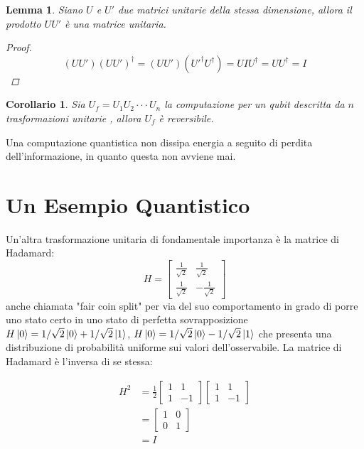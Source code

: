 \documentclass[12pt,a4paper,openright]{report}
\newtheorem{mylem}{Lemma}
\newtheorem*{mycor}{Corollario}
\begin{document}
\begin{mylem}
    Siano $U$ e $U'$ due matrici unitarie della stessa dimensione, allora il prodotto $UU'$ è una matrice unitaria.
    \begin{proof}
        \[
            (UU')(UU')^{\dag}=(UU')({U'}^{\dag}{U}^{\dag}) = UIU^{\dag} = UU^{\dag} = I
        \]
    \end{proof}
\end{mylem} 
\begin{mycor}
    Sia $U_f=U_1U_2 \cdot\cdot\cdot U_n$ la computazione per un qubit descritta da $n$ trasformazioni unitarie , allora $U_f$ è reversibile. 
\end{mycor}
Una computazione quantistica non dissipa energia a seguito di perdita dell'informazione, in quanto questa non avviene mai. 
\section{Un Esempio Quantistico}

Un'altra trasformazione unitaria di fondamentale importanza è la matrice di Hadamard:
\[
    H=\begin{bmatrix}
        \frac{1}{\sqrt2} & \frac{1}{\sqrt2} \\
        \frac{1}{\sqrt2} & -\frac{1}{\sqrt2} 
    \end{bmatrix}
\] 
anche chiamata "fair coin split" per via del suo comportamento in grado di porre uno stato certo in uno stato di perfetta sovrapposizione 
$H\ket0 = 1/\sqrt2\ket0 + 1/\sqrt2\ket1$, $H\ket0 = 1/\sqrt2\ket0 - 1/\sqrt2\ket1$ che presenta una distribuzione di probabilità uniforme
sui valori dell'osservabile.
La matrice di Hadamard è l'inversa di se stessa:
\begin{center}
    \begin{align*}
        H^2 &= \frac{1}{2}\begin{bmatrix}
            1 & 1 \\
            1 & -1 
        \end{bmatrix}\begin{bmatrix}
            1 & 1 \\
            1 & -1 
        \end{bmatrix}\\
        &= \begin{bmatrix}
            1 & 0\\
            0 & 1
        \end{bmatrix}\\ 
        &= I
    \end{align*}
\end{center}
 
\end{document}
